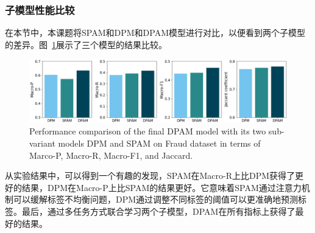 \subsubsection{子模型性能比较}
在本节中，本课题将SPAM和DPM和DPAM模型进行对比，以便看到两个子模型的差异。图~\ref{fig:comSubm}展示了三个模型的结果比较。
\begin{figure}[htbp]%
\centering
\includegraphics[scale=0.30, clip=true]{./sources/comSubm2.eps}
\caption{\label{fig:comSubm}Performance comparison of the final DPAM model with its two sub-variant models DPM and SPAM on Fraud dataset in terms of Marco-P, Macro-R, Macro-F1, and Jaccard.}
\end{figure}

从实验结果中，可以得到一个有趣的发现，SPAM在Macro-R上比DPM获得了更好的结果，DPM在Macro-P上比SPAM的结果更好。它意味着SPAM通过注意力机制可以缓解标签不均衡问题，DPM通过调整不同标签的阈值可以更准确地预测标签。最后，通过多任务方式联合学习两个子模型，DPAM在所有指标上获得了最好的结果。


